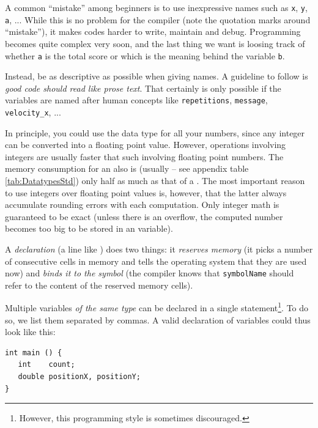 \begin{hintbox}
A common \enquote{mistake} among beginners is to use inexpressive names such as \texttt{x}, \texttt{y}, \texttt{a}, ... While this is no problem for the compiler (note the quotation marks around \enquote{mistake}), it makes codes harder to write, maintain and debug. Programming becomes quite complex very soon, and the last thing we want is loosing track of whether \texttt{a} is the total score or which is the meaning behind the variable \texttt{b}.

Instead, be as descriptive as possible when giving names. A guideline to follow is \emph{good code should read like prose text}. That certainly is only possible if the variables are named after human concepts like \texttt{repetitions}, \texttt{message}, \texttt{velocity\_x}, ...
\end{hintbox}

\begin{hintbox}
In principle, you could use the data type  for all your numbers, since any integer can be converted into a floating point value. However, operations involving integers are usually faster that such involving floating point numbers. The memory consumption for an  also is (usually -- see appendix table \ref{tab:DatatypesStd}) only half as much as that of a . The most important reason to use integers over floating point values is, however, that the latter always accumulate rounding errors with each computation. Only integer math is guaranteed to be exact (unless there is an overflow, \ie the computed number becomes too big to be stored in an  variable).
\end{hintbox}

A \emph{declaration} (\ie a line like ) does two things: it \emph{reserves memory} (\ie it picks a number of consecutive cells in memory and tells the operating system that they are used now) and \emph{binds it to the symbol} (\ie the compiler knows that \texttt{symbolName} should refer to the content of the reserved memory cells).

Multiple variables \emph{of the same type} can be declared in a single statement\footnote{However, this programming style is sometimes discouraged.}. To do so, we list them separated by commas. A valid declaration of variables could thus look like this:
\begin{codebox}[declarations.c]
\begin{verbatim}
int main () {
   int    count;
   double positionX, positionY;
}
\end{verbatim}
 \label{code:declaringVars}
\end{codebox}

